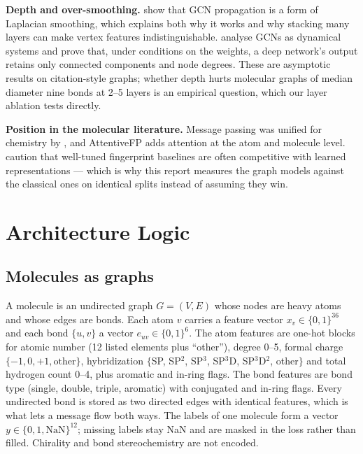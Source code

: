 \documentclass[conference]{IEEEtran}
\begin{document}
\textbf{Depth and over-smoothing.} \citet{li2018oversmooth} show that GCN propagation is a form
of Laplacian smoothing, which explains both why it works and why stacking many layers can make
vertex features indistinguishable. \citet{oono2020expressive} analyse GCNs as dynamical systems
and prove that, under conditions on the weights, a deep network's output retains only connected
components and node degrees. These are asymptotic results on citation-style graphs; whether
depth hurts molecular graphs of median diameter nine bonds at 2--5 layers is an empirical
question, which our layer ablation tests directly.

\textbf{Position in the molecular literature.} Message passing was unified for chemistry by
\citet{gilmer2017mpnn}, and AttentiveFP \citep{xiong2020attentivefp} adds attention at the atom
and molecule level. \citet{yang2019analyzing} caution that well-tuned fingerprint baselines are
often competitive with learned representations --- which is why this report measures the graph
models against the classical ones on identical splits instead of assuming they win.

\section{Architecture Logic}
\label{sec:arch}
\subsection{Molecules as graphs}
A molecule is an undirected graph $G=(V,E)$ whose nodes are heavy atoms and whose edges are
bonds. Each atom $v$ carries a feature vector $x_v\in\{0,1\}^{36}$ and each bond $\{u,v\}$ a
vector $e_{uv}\in\{0,1\}^{6}$. The atom features are one-hot blocks for atomic number (12 listed
elements plus ``other''), degree 0--5, formal charge $\{-1,0,+1,\text{other}\}$, hybridization
$\{$SP, SP$^2$, SP$^3$, SP$^3$D, SP$^3$D$^2$, other$\}$ and total hydrogen count 0--4, plus
aromatic and in-ring flags. The bond features are bond type (single, double, triple, aromatic)
with conjugated and in-ring flags. Every undirected bond is stored as two directed edges with
identical features, which is what lets a message flow both ways. The labels of one molecule form
a vector $y\in\{0,1,\mathrm{NaN}\}^{12}$; missing labels stay NaN and are masked in the loss
rather than filled. Chirality and bond stereochemistry are not encoded.
\end{document}
